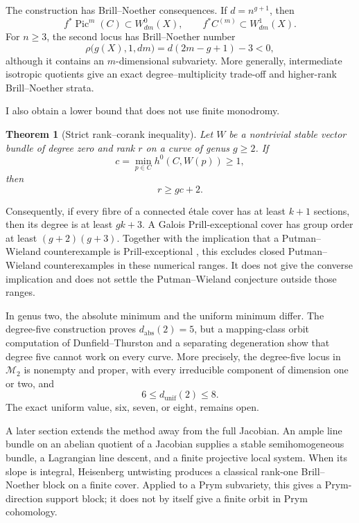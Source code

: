 \documentclass[11pt,reqno]{amsart}
\numberwithin{equation}{section}
\newtheorem{theorem}{Theorem}[section]
\theoremstyle{remark}
\DeclareMathOperator{\Pic}{Pic}
\begin{document}
The construction has Brill--Noether consequences.  If
\(d=n^{g+1}\), then
\[
 f^*\Pic^m(C)\subset W_{dm}^0(X),\qquad
 f^*C^{(m)}\subset W_{dm}^1(X).
\]
For \(n\geq3\), the second locus has Brill--Noether number
\[
 \rho\bigl(g(X),1,dm\bigr)=d(2m-g+1)-3<0,
\]
although it contains an \(m\)-dimensional subvariety.  More generally,
intermediate isotropic quotients give an exact degree--multiplicity
trade-off and higher-rank Brill--Noether strata.

I also obtain a lower bound that does not use finite monodromy.

\begin{theorem}[Strict rank--corank inequality]\label{thm:intro-rank}
Let \(W\) be a nontrivial stable vector bundle of degree zero and rank
\(r\) on a curve of genus \(g\geq2\).  If
\[
 c=\min_{p\in C}h^0(C,W(p))\geq1,
\]
then
\[
 r\geq gc+2.
\tag{1.5}\label{eq:intro-rank}
\]
\end{theorem}

Consequently, if every fibre of a connected \'etale cover has at least
\(k+1\) sections, then its degree is at least \(gk+3\).  A Galois
Prill-exceptional cover has group order at least
\((g+2)(g+3)\).  Together with the implication that a Putman--Wieland
counterexample is Prill-exceptional
\cite[Lemma 5.5]{LandesmanLittApplications}, this excludes closed
Putman--Wieland counterexamples in these numerical ranges.  It does not
give the converse implication and does not settle the Putman--Wieland
conjecture outside those ranges.

In genus two, the absolute minimum and the uniform minimum differ.  The
degree-five construction proves \(d_{\mathrm{abs}}(2)=5\), but a
mapping-class orbit computation of Dunfield--Thurston and a separating
degeneration show that degree five cannot work on every curve.  More
precisely, the degree-five locus in \(\mathcal M_2\) is nonempty and
proper, with every irreducible component of dimension one or two, and
\[
 6\leq d_{\mathrm{unif}}(2)\leq8.
\tag{1.6}\label{eq:intro-uniform-genus-two-range}
\]
The exact uniform value, six, seven, or eight, remains open.

A later section extends the method away from the full Jacobian.  An
ample line bundle on an abelian quotient of a Jacobian supplies a stable
semihomogeneous bundle, a Lagrangian line descent, and a finite
projective local system.  When its slope is integral, Heisenberg
untwisting produces a classical rank-one Brill--Noether block on a
finite cover.  Applied to a Prym subvariety, this gives a
Prym-direction support block; it does not by itself give a finite orbit
in Prym cohomology.
\end{document}
